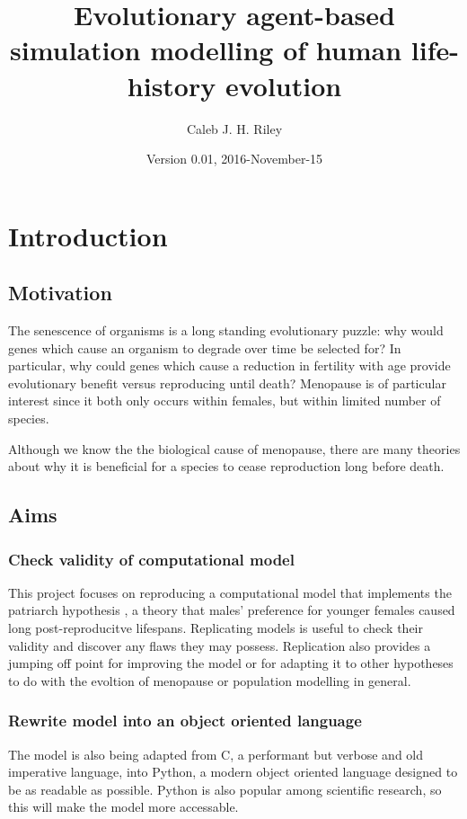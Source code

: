 \documentclass[authoryearcitations]{UoYCSproject}
\author{Caleb J. H. Riley}
\title{Evolutionary agent-based simulation modelling of human life-history evolution}
\date{Version 0.01, 2016-November-15}
\begin{document}
\maketitle
\listoffigures
\listoftables

\cleardoublepage

\chapter{Introduction}
\label{cha:Introduction}
\section{Motivation}
The senescence of organisms is a long standing evolutionary puzzle: why would genes which cause an organism to degrade over time be selected for? In particular, why could genes which cause a reduction in fertility with age provide evolutionary benefit versus reproducing until death? Menopause is of particular interest since it both only occurs within females, but within limited number of species.

Although we know the the biological cause of menopause, there are many theories about why it is beneficial for a species to cease reproduction long before death. 


\section{Aims}
\subsection{Check validity of computational model}
This project focuses on reproducing a computational model \cite{mateChoice2013} that implements the patriarch hypothesis \cite{patriarchHypothesis2000}, a theory that males' preference for younger females caused long post-reproducitve lifespans. Replicating models is useful to check their validity and discover any flaws they may possess. Replication also provides a jumping off point for improving the model or for adapting it to other hypotheses to do with the evoltion of menopause or population modelling in general. 

\subsection{Rewrite model into an object oriented language}
The model is also being adapted from C, a performant but verbose and old imperative language, into Python, a modern object oriented language designed to be as readable as possible. Python is also popular among scientific research, so this will make the model more accessable.
\end{document}
